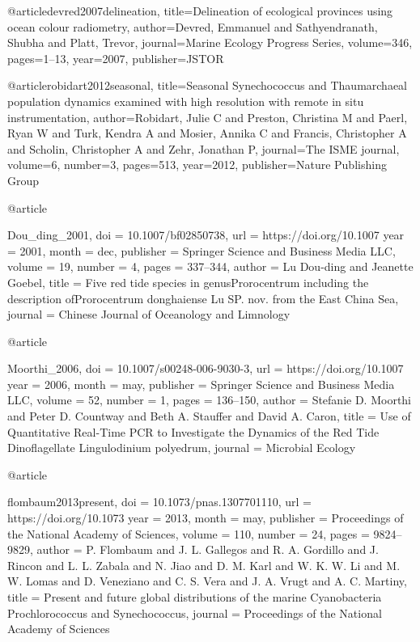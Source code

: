 {{{{{{{{{@article{devred2007delineation,
  title={Delineation of ecological provinces using ocean colour radiometry},
  author={Devred, Emmanuel and Sathyendranath, Shubha and Platt, Trevor},
  journal={Marine Ecology Progress Series},
  volume={346},
  pages={1--13},
  year={2007},
  publisher={JSTOR}
}



@article{robidart2012seasonal,
  title={Seasonal Synechococcus and Thaumarchaeal population dynamics examined with high resolution with remote in situ instrumentation},
  author={Robidart, Julie C and Preston, Christina M and Paerl, Ryan W and Turk, Kendra A and Mosier, Annika C and Francis, Christopher A and Scholin, Christopher A and Zehr, Jonathan P},
  journal={The ISME journal},
  volume={6},
  number={3},
  pages={513},
  year={2012},
  publisher={Nature Publishing Group}
}

@article{Dou_ding_2001,
	doi = {10.1007/bf02850738},
	url = {https://doi.org/10.1007%
	year = 2001,
	month = {dec},
	publisher = {Springer Science and Business Media {LLC}},
	volume = {19},
	number = {4},
	pages = {337--344},
	author = {Lu Dou-ding and Jeanette Goebel},
	title = {Five red tide species in {genusProrocentrum} including the description {ofProrocentrum} donghaiense Lu {SP}. nov. from the East China Sea},
	journal = {Chinese Journal of Oceanology and Limnology}
}

@article{Moorthi_2006,
	doi = {10.1007/s00248-006-9030-3},
	url = {https://doi.org/10.1007%
	year = 2006,
	month = {may},
	publisher = {Springer Science and Business Media {LLC}},
	volume = {52},
	number = {1},
	pages = {136--150},
	author = {Stefanie D. Moorthi and Peter D. Countway and Beth A. Stauffer and David A. Caron},
	title = {Use of Quantitative Real-Time {PCR} to Investigate the Dynamics of the Red Tide Dinoflagellate Lingulodinium polyedrum},
	journal = {Microbial Ecology}
}

@article{flombaum2013present,
	doi = {10.1073/pnas.1307701110},
	url = {https://doi.org/10.1073%
	year = 2013,
	month = {may},
	publisher = {Proceedings of the National Academy of Sciences},
	volume = {110},
	number = {24},
	pages = {9824--9829},
	author = {P. Flombaum and J. L. Gallegos and R. A. Gordillo and J. Rincon and L. L. Zabala and N. Jiao and D. M. Karl and W. K. W. Li and M. W. Lomas and D. Veneziano and C. S. Vera and J. A. Vrugt and A. C. Martiny},
	title = {Present and future global distributions of the marine Cyanobacteria Prochlorococcus and Synechococcus},
	journal = {Proceedings of the National Academy of Sciences}
}

}}}}}}}}}}}}
